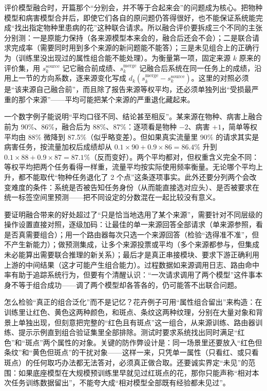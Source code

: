 评价模型融合时，开篇那个“分别会，并不等于合起来会”的问题成为核心。把物种模型和病害模型合并后，即使它们各自的原问题仍答得很好，也不能保证系统能完成“找出指定物种里患病的花”这种联合请求。所以融合评价要拆成三个不同的主张分别测：一是原能力保持（各来源模型本来会的，融合后还会不会）；二是联合请求完成率（需要同时用到多个来源的新问题能不能答）；三是未见组合上的正确行为（训练里没出现过的属性组合能不能处理）。为衡量第一项，固定来源 $k$ 原来的评价集，用 $s_k^{\mathrm{source}}$ 记它融合前成绩、$s_k^{\mathrm{merge}}$ 记融合后系统在同一任务上的成绩，沿用上一节的方向系数，逐来源变化写成 $d_k(s_k^{\mathrm{merge}}-s_k^{\mathrm{source}})$。这里的对照必须是“该来源自己融合前”，而且除了报告来源等权平均，还必须单独列出“受损最严重的那个来源”——平均可能把某个来源的严重退化藏起来。

一个数字例子能说明“平均口径不同、结论甚至相反”。某来源在物种、病害上融合前为 90\%、86\%，融合后为 88\%、87\%：逐项看是物种 $-2$、病害 $+1$，简单等权平均由 88\% 微降到 87.5\%（似乎略变差）。但如果真实流量里 90\% 的请求其实是病害任务，按流量加权后成绩却从 $0.1\times90+0.9\times86=86.4\%$ 升到 $0.1\times88+0.9\times87=87.1\%$（反而变好）。两个平均都对，但权重含义完全不同：等权平均把两个任务看得一样重，流量平均按实际使用频率衡量。无论哪个平均上升，都不能取代“物种任务退化了 2 个点”这条逐项事实。此外还要分列两个会改变难度的条件：系统是否被告知任务身份（从而能直接选对应头）、是否被要求在统一标签空间里预测——把不同设定的分数混在一起比较没有意义。

要证明融合带来的好处超过了“只是恰当地选用了某个来源”，需要针对不同层级的操作设置直接对照，逐级加码：让最佳的单一来源回答全部请求（单来源参照，看是否真需要组合）；用一个路由器每次只选一个来源回答（检验“选得准不准”，但不产生新能力）；做预测集成，让多个来源投票或平均（多个来源都参与，但集成未必能算出需要联合推理的新关系）；最后才是真正串接模块、要求下游正确利用上游的中间结果（这才可能产生组合能力）。过程数据如来源调用日志、路由命中率有助于追踪系统行为，但要有个清醒认识：“一次请求调用了两个模型”这件事本身不等于组合成功——调了两个模型却各答各的，仍可能答不出联合问题。

怎么检验“真正的组合泛化”而不是记忆？花卉例子可用“属性组合留出”来构造：在训练里让红色、黄色这两种颜色，和斑点、条纹这两种纹理，分别在大量对象和背景上单独出现，但刻意把完整的“红色且有斑点”这一组合，从来源训练、路由器训练、提示示例直到组合验证集里全部排除。测试时要求系统找出同时满足“红色”和“斑点”两个属性的对象。关键的防作弊设计是：同一场景里还要放入“红色但条纹”和“黄色但斑点”的干扰对象——这样一来，只凭单一属性（只看红、或只看斑点）的任何取巧办法都无法答对，必须真正做合取。还要诚实界定“未见”的范围：如果底座模型在大规模预训练里早就见过红斑点的花，那你只能声称“相对本次任务训练数据留出”，不能夸大成“相对模型全部既有经验都未见过”。

